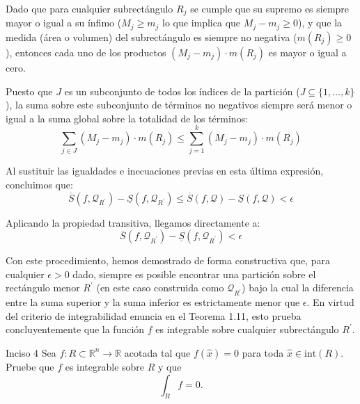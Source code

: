 \documentclass[11pt,letterpaper]{article}
\begin{document}
Dado que para cualquier subrectángulo $R_{j}$ se cumple que su supremo es siempre mayor o igual a su ínfimo ($M_{j} \ge m_{j}$ lo que implica que $M_{j} - m_{j} \ge 0$), y que la medida (área o volumen) del subrectángulo es siempre no negativa ($m(R_{j}) \ge 0$), entonces cada uno de los productos $(M_{j} - m_{j}) \cdot m(R_{j})$ es mayor o igual a cero. 

Puesto que $J$ es un subconjunto de todos los índices de la partición ($J \subseteq \{1, \dots, k\}$), la suma sobre este subconjunto de términos no negativos siempre será menor o igual a la suma global sobre la totalidad de los términos:
\begin{equation*}
\sum_{j \in J} (M_{j} - m_{j}) \cdot m(R_{j}) \le \sum_{j=1}^{k} (M_{j} - m_{j}) \cdot m(R_{j})
\end{equation*}

Al sustituir las igualdades e inecuaciones previas en esta última expresión, concluimos que:
\begin{equation*}
\overline{S}(f,\mathcal{Q}_{R^{\prime}}) - \underline{S}(f,\mathcal{Q}_{R^{\prime}}) \le \overline{S}(f,\mathcal{Q}) - \underline{S}(f,\mathcal{Q}) < \epsilon
\end{equation*}

Aplicando la propiedad transitiva, llegamos directamente a:
\begin{equation*}
\overline{S}(f,\mathcal{Q}_{R^{\prime}}) - \underline{S}(f,\mathcal{Q}_{R^{\prime}}) < \epsilon
\end{equation*}

Con este procedimiento, hemos demostrado de forma constructiva que, para cualquier $\epsilon > 0$ dado, siempre es posible encontrar una partición sobre el rectángulo menor $R^{\prime}$ (en este caso construida como $\mathcal{Q}_{R^{\prime}}$) bajo la cual la diferencia entre la suma superior y la suma inferior es estrictamente menor que $\epsilon$. En virtud del criterio de integrabilidad enuncia en el Teorema 1.11, esto prueba concluyentemente que la función $f$ es integrable sobre cualquier subrectángulo $R^{\prime}$.


\begin{inciso}{Inciso 4}
Sea $f:R\subset\mathbb{R}^{n}\rightarrow\mathbb{R}$ acotada tal que $f(\hat{x})=0$ para toda $\hat{x}\in \text{int}(R).$ Pruebe que $f$ es integrable sobre $R$ y que
\begin{equation*}
    \int_{R}f=0.
\end{equation*}
\end{inciso}
\end{document}
